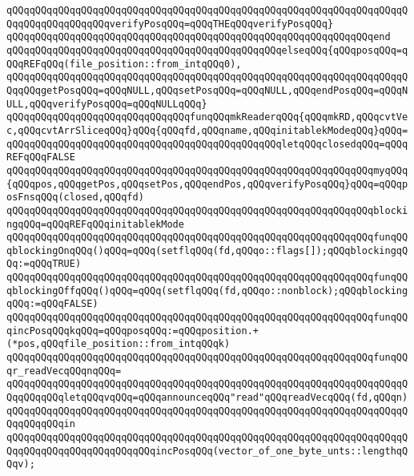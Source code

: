 \verb|qQQqqQQqqQQqqQQqqQQqqQQqqQQqqQQqqQQqqQQqqQQqqQQqqQQqqQQqqQQqqQQqqQQqqQQqqQQqqQQqqQQqqQQqverifyPosqQQq=qQQqTHEqQQqverifyPosqQQq}|\newline
\verb|qQQqqQQqqQQqqQQqqQQqqQQqqQQqqQQqqQQqqQQqqQQqqQQqqQQqqQQqqQQqqQQqend|\newline
\verb|qQQqqQQqqQQqqQQqqQQqqQQqqQQqqQQqqQQqqQQqqQQqqQQqelseqQQq{qQQqposqQQq=qQQqREFqQQq(file_position::from_intqQQq0),|\newline
\verb|qQQqqQQqqQQqqQQqqQQqqQQqqQQqqQQqqQQqqQQqqQQqqQQqqQQqqQQqqQQqqQQqqQQqqQQqqQQqgetPosqQQq=qQQqNULL,qQQqsetPosqQQq=qQQqNULL,qQQqendPosqQQq=qQQqNULL,qQQqverifyPosqQQq=qQQqNULLqQQq}|\newline
\newline
\verb|qQQqqQQqqQQqqQQqqQQqqQQqqQQqqQQqfunqQQqmkReaderqQQq{qQQqmkRD,qQQqcvtVec,qQQqcvtArrSliceqQQq}qQQq{qQQqfd,qQQqname,qQQqinitablekModeqQQq}qQQq=|\newline
\verb|qQQqqQQqqQQqqQQqqQQqqQQqqQQqqQQqqQQqqQQqqQQqqQQqletqQQqclosedqQQq=qQQqREFqQQqFALSE|\newline
\verb|qQQqqQQqqQQqqQQqqQQqqQQqqQQqqQQqqQQqqQQqqQQqqQQqqQQqqQQqqQQqqQQqmyqQQq{qQQqpos,qQQqgetPos,qQQqsetPos,qQQqendPos,qQQqverifyPosqQQq}qQQq=qQQqposFnsqQQq(closed,qQQqfd)|\newline
\verb|qQQqqQQqqQQqqQQqqQQqqQQqqQQqqQQqqQQqqQQqqQQqqQQqqQQqqQQqqQQqqQQqblockingqQQq=qQQqREFqQQqinitablekMode|\newline
\verb|qQQqqQQqqQQqqQQqqQQqqQQqqQQqqQQqqQQqqQQqqQQqqQQqqQQqqQQqqQQqqQQqfunqQQqblockingOnqQQq()qQQq=qQQq(setflqQQq(fd,qQQqo::flags[]);qQQqblockingqQQq:=qQQqTRUE)|\newline
\verb|qQQqqQQqqQQqqQQqqQQqqQQqqQQqqQQqqQQqqQQqqQQqqQQqqQQqqQQqqQQqqQQqfunqQQqblockingOffqQQq()qQQq=qQQq(setflqQQq(fd,qQQqo::nonblock);qQQqblockingqQQq:=qQQqFALSE)|\newline
\verb|qQQqqQQqqQQqqQQqqQQqqQQqqQQqqQQqqQQqqQQqqQQqqQQqqQQqqQQqqQQqqQQqfunqQQqincPosqQQqkqQQq=qQQqposqQQq:=qQQqposition.+(*pos,qQQqfile_position::from_intqQQqk)|\newline
\verb|qQQqqQQqqQQqqQQqqQQqqQQqqQQqqQQqqQQqqQQqqQQqqQQqqQQqqQQqqQQqqQQqfunqQQqr_readVecqQQqnqQQq=|\newline
\verb|qQQqqQQqqQQqqQQqqQQqqQQqqQQqqQQqqQQqqQQqqQQqqQQqqQQqqQQqqQQqqQQqqQQqqQQqqQQqqQQqletqQQqvqQQq=qQQqannounceqQQq"read"qQQqreadVecqQQq(fd,qQQqn)|\newline
\verb|qQQqqQQqqQQqqQQqqQQqqQQqqQQqqQQqqQQqqQQqqQQqqQQqqQQqqQQqqQQqqQQqqQQqqQQqqQQqqQQqin|\newline
\verb|qQQqqQQqqQQqqQQqqQQqqQQqqQQqqQQqqQQqqQQqqQQqqQQqqQQqqQQqqQQqqQQqqQQqqQQqqQQqqQQqqQQqqQQqqQQqqQQqincPosqQQq(vector_of_one_byte_unts::lengthqQQqv);|\newline
